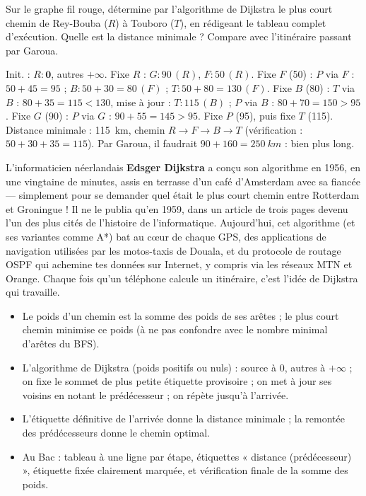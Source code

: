 \documentclass[11pt]{article}
\newcommand{\cle}[1]{{\popxbold\color{popdark}#1}}
\begin{document}
\begin{exercice}
Sur le graphe fil rouge, détermine par l'algorithme de Dijkstra le plus court chemin de Rey-Bouba ($R$) à Touboro ($T$), en rédigeant le tableau complet d'exécution. Quelle est la distance minimale ? Compare avec l'itinéraire passant par Garoua.
\end{exercice}

\begin{corrige}[Exercice 1]
Init. : $R : \mathbf{0}$, autres $+\infty$. Fixe $R$ : $G : 90\,(R)$, $F : 50\,(R)$. Fixe $F$ (50) : $P$ via $F$ : $50+45=95$ ; $B : 50+30=80\,(F)$ ; $T : 50+80=130\,(F)$. Fixe $B$ (80) : $T$ via $B$ : $80+35=115 < 130$, mise à jour : $T : 115\,(B)$ ; $P$ via $B$ : $80+70=150 > 95$. Fixe $G$ (90) : $P$ via $G$ : $90+55=145 > 95$. Fixe $P$ (95), puis fixe $T$ (115). Distance minimale : \SI{115}{km}, chemin $R \to F \to B \to T$ (vérification : $50+30+35=115$). Par Garoua, il faudrait $90 + 160 = \SI{250}{km}$ : bien plus long.
\end{corrige}

\begin{savaistu}
L'informaticien néerlandais \textbf{Edsger Dijkstra} a conçu son algorithme en 1956, en une vingtaine de minutes, assis en terrasse d'un café d'Amsterdam avec sa fiancée — simplement pour se demander quel était le plus court chemin entre Rotterdam et Groningue ! Il ne le publia qu'en 1959, dans un article de trois pages devenu l'un des plus cités de l'histoire de l'informatique. Aujourd'hui, cet algorithme (et ses variantes comme A*) bat au cœur de chaque GPS, des applications de navigation utilisées par les motos-taxis de Douala, et du protocole de routage OSPF qui achemine tes données sur Internet, y compris via les réseaux MTN et Orange. Chaque fois qu'un téléphone calcule un itinéraire, c'est l'idée de Dijkstra qui travaille.
\end{savaistu}

\begin{aretenir}
\begin{itemize}
\item Le \cle{poids d'un chemin} est la somme des poids de ses arêtes ; le \cle{plus court chemin} minimise ce poids (à ne pas confondre avec le nombre minimal d'arêtes du BFS).
\item L'\cle{algorithme de Dijkstra} (poids positifs ou nuls) : source à $0$, autres à $+\infty$ ; on fixe le sommet de plus petite étiquette provisoire ; on met à jour ses voisins en notant le prédécesseur ; on répète jusqu'à l'arrivée.
\item L'étiquette définitive de l'arrivée donne la \cle{distance minimale} ; la \cle{remontée des prédécesseurs} donne le chemin optimal.
\item Au Bac : tableau à une ligne par étape, étiquettes « distance (prédécesseur) », étiquette fixée clairement marquée, et vérification finale de la somme des poids.
\end{itemize}
\end{aretenir}
\end{document}

